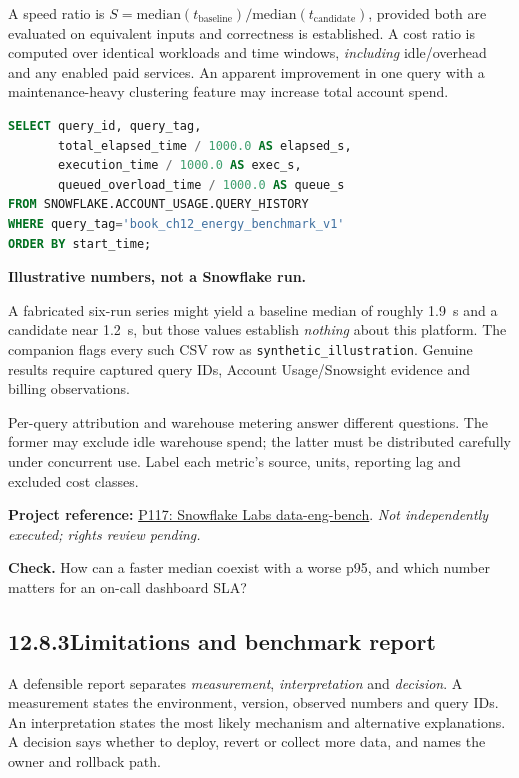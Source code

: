 \documentclass[11pt,twoside]{article}
\newcommand{\topic}[2]{\subsection*{#1\quad #2}}
\newcommand{\repo}[2]{\par\begingroup\fontsize{8.0}{9.6}\selectfont\sffamily\color{inkgray}\textbf{Project reference:} \href{#2}{#1}. \textit{Not independently executed; rights review pending.}\par\endgroup}
\begin{document}
A speed ratio is $S=\mathrm{median}(t_{\mathrm{baseline}})/\mathrm{median}(t_{\mathrm{candidate}})$, provided both are evaluated on equivalent inputs and correctness is established. A cost ratio is computed over identical workloads and time windows, \emph{including} idle/overhead and any enabled paid services. An apparent improvement in one query with a maintenance-heavy clustering feature may increase total account spend.
\begin{lstlisting}[language=SQL,caption={Read-only history of approved tagged runs.}]
SELECT query_id, query_tag,
       total_elapsed_time / 1000.0 AS elapsed_s,
       execution_time / 1000.0 AS exec_s,
       queued_overload_time / 1000.0 AS queue_s
FROM SNOWFLAKE.ACCOUNT_USAGE.QUERY_HISTORY
WHERE query_tag='book_ch12_energy_benchmark_v1'
ORDER BY start_time;
\end{lstlisting}
\begin{whitebox}\textbf{Illustrative numbers, not a Snowflake run.}\par
A fabricated six-run series might yield a baseline median of roughly 1.9~s and a candidate near 1.2~s, but those values establish \emph{nothing} about this platform. The companion flags every such CSV row as \texttt{synthetic\_illustration}. Genuine results require captured query IDs, Account Usage/Snowsight evidence and billing observations.\end{whitebox}
Per-query attribution and warehouse metering answer different questions. The former may exclude idle warehouse spend; the latter must be distributed carefully under concurrent use. Label each metric's source, units, reporting lag and excluded cost classes.
\repo{P117: Snowflake Labs data-eng-bench}{https://github.com/Snowflake-Labs/data-eng-bench}
\textbf{Check.} How can a faster median coexist with a worse p95, and which number matters for an on-call dashboard SLA?
\newpage
\topic{12.8.3}{Limitations and benchmark report}
A defensible report separates \emph{measurement}, \emph{interpretation} and \emph{decision}. A measurement states the environment, version, observed numbers and query IDs. An interpretation states the most likely mechanism and alternative explanations. A decision says whether to deploy, revert or collect more data, and names the owner and rollback path.
\end{document}
